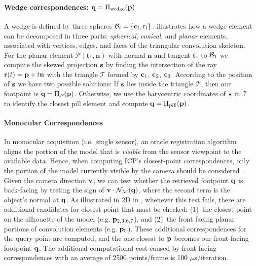 \paragraph{Wedge correspondences: $\mathbf{q}=\Pi_\text{wedge}(\mathbf{p})$}
A wedge is defined by three spheres $\mathcal{B}_i = \{\mathbf{c}_i, r_i\}$.   illustrates how a wedge element can be decomposed in three parts: \emph{spherical}, \emph{conical}, and \emph{planar} elements, associated with vertices, edges, and faces of the triangular convolution skeleton. For the planar element $\mathcal{P}(\mathbf{t}_1,\mathbf{n})$ with normal $\mathbf{n}$ and tangent $\mathbf{t}_1$ to $\mathcal{B}_1$
%
we compute the skewed projection $\mathbf{s}$ by finding the intersection of the ray $\mathbf{r}(t) = \mathbf{p} + t\mathbf{n}$ with the triangle $\mathcal{T}$ formed by $\mathbf{c}_1$, $\mathbf{c}_2$, $\mathbf{c}_3$. 
% 
According to the position of $\mathbf{s}$ we have two possible solutions:
If $\mathbf{s}$ lies inside the triangle $\mathcal{T}$, then our footpoint is $\mathbf{q} = \Pi_\mathcal{P}(\mathbf{p})$. Otherwise, we use the barycentric coordinates of $\mathbf{s}$ in $\mathcal{T}$ to identify the closest pill element and compute $\mathbf{q}=\Pi_\text{pill}(\mathbf{p})$.

\paragraph{Monocular Correspondences}
In monocular acquisition (i.e.\ single sensor), an oracle registration algorithm aligns the portion of the model that is \emph{visible} from the sensor viewpoint to the available data. Hence, when computing ICP's closest-point correspondences, only the portion of the model currently visible by the camera should be considered~\cite{tagliasacchi2015robust}. Given the camera direction $\mathbf{v}$, we can test whether the retrieved footpoint $\mathbf{q}$ is back-facing by testing the sign of $\mathbf{v} \cdot \mathcal{N}_{\mathcal{M}}(\mathbf{q})$, where the second term is the object's normal at $\mathbf{q}$. As illustrated in 2D in , whenever this test fails, there are additional candidates for closest point that must be checked: (1)~the closest-point on the silhouette of the model (e.g. $\mathbf{p}_{2,3,6,7}$), and (2)~the front facing planar portions of convolution elements (e.g. $\mathbf{p}_{5}$). These additional correspondences for the query point are computed, and the one closest to $\mathbf{p}$ becomes our front-facing footpoint $\mathbf{q}$. The additional computational cost caused by front-facing correspondences with an average of 2500 points/frame is 100 $\mu s$/iteration.

